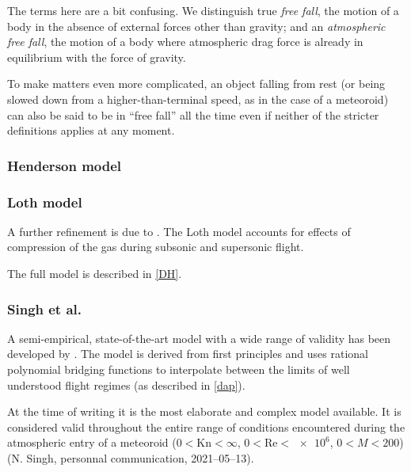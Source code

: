             \begin{example}
                The terms here are a bit confusing. We distinguish true \emph{free fall},
                the motion of a body in the absence of external forces other than gravity;
                and an \emph{atmospheric free fall}, the motion of a body where atmospheric drag force is already in equilibrium
                with the force of gravity.

                To make matters even more complicated, an object falling from rest
                (or being slowed down from a higher-than-terminal speed, as in the case of a meteoroid)
                can also be said to be in ``free fall'' all the time even if neither
                of the stricter definitions applies at any moment.
            \end{example}

        \subsubsection{Henderson model} \label{fdmH}

        \subsubsection{Loth model} \label{fdmL}
            A further refinement is due to \cite{loth???}.
            The Loth model accounts for effects of compression of the gas
            during subsonic and supersonic flight.

            The full model is described in \cref{DH}.

        \subsubsection{Singh et al.} \label{fdmS}
            A semi-empirical, state-of-the-art model with a wide range of validity has been developed by
            \citet{singh+2020}. The model is derived from first principles and
            uses rational polynomial bridging functions to interpolate between
            the limits of well understood flight regimes (as described in \cref{dap}).

            At the time of writing it is the most elaborate and complex model available.
            It is considered valid throughout the entire range of
            conditions encountered during the atmospheric entry of a meteoroid
            ($0 < \mathrm{Kn} < \infty$, $0 < \mathrm{Re} < \num{e6}$, $0 < M < 200$)
            (N. Singh, personnal communication, 2021--05--13).

